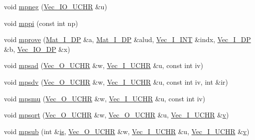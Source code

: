 \begin{DoxyCompactItemize}
\item 
void \mbox{\hyperlink{namespaceNR_a685e7aacef1a2fa63acc2b0075848293}{mpneg}} (\mbox{\hyperlink{namespaceNR_ad0cd08c957bbfcd9b612069da683fed4}{Vec\+\_\+\+I\+O\+\_\+\+U\+C\+HR}} \&u)
\item 
void \mbox{\hyperlink{namespaceNR_a994c170707a8aab5444d4d126e7a7d23}{mppi}} (const int np)
\item 
void \mbox{\hyperlink{namespaceNR_a0c4cae16b0250ecbf95693adf73c8bdc}{mprove}} (\mbox{\hyperlink{namespaceNR_a2b8abfda8fffad6ba0a1b5a4c0773dbf}{Mat\+\_\+\+I\+\_\+\+DP}} \&a, \mbox{\hyperlink{namespaceNR_a2b8abfda8fffad6ba0a1b5a4c0773dbf}{Mat\+\_\+\+I\+\_\+\+DP}} \&alud, \mbox{\hyperlink{namespaceNR_ae67ce7dc86a8a64a7ce73c3c030ff610}{Vec\+\_\+\+I\+\_\+\+I\+NT}} \&indx, \mbox{\hyperlink{namespaceNR_a9f943da53862537c552e2a770cb170ae}{Vec\+\_\+\+I\+\_\+\+DP}} \&b, \mbox{\hyperlink{namespaceNR_ab293e06a6bf799d8a7ed932b6852bcb8}{Vec\+\_\+\+I\+O\+\_\+\+DP}} \&x)
\item 
void \mbox{\hyperlink{namespaceNR_a73ec9a62342ed00c7ed70bfedecf5947}{mpsad}} (\mbox{\hyperlink{namespaceNR_ac322e5f1208609bf101390ed2495b7d5}{Vec\+\_\+\+O\+\_\+\+U\+C\+HR}} \&w, \mbox{\hyperlink{namespaceNR_ace0fbcd7daadfbf5e4e7db2a317a5b46}{Vec\+\_\+\+I\+\_\+\+U\+C\+HR}} \&u, const int iv)
\item 
void \mbox{\hyperlink{namespaceNR_afb23bc7a9b2440c5a3db4da885920358}{mpsdv}} (\mbox{\hyperlink{namespaceNR_ac322e5f1208609bf101390ed2495b7d5}{Vec\+\_\+\+O\+\_\+\+U\+C\+HR}} \&w, \mbox{\hyperlink{namespaceNR_ace0fbcd7daadfbf5e4e7db2a317a5b46}{Vec\+\_\+\+I\+\_\+\+U\+C\+HR}} \&u, const int iv, int \&ir)
\item 
void \mbox{\hyperlink{namespaceNR_a7e4bcd285f6961beca936346cd63f092}{mpsmu}} (\mbox{\hyperlink{namespaceNR_ac322e5f1208609bf101390ed2495b7d5}{Vec\+\_\+\+O\+\_\+\+U\+C\+HR}} \&w, \mbox{\hyperlink{namespaceNR_ace0fbcd7daadfbf5e4e7db2a317a5b46}{Vec\+\_\+\+I\+\_\+\+U\+C\+HR}} \&u, const int iv)
\item 
void \mbox{\hyperlink{namespaceNR_a73de1f888d26e631949996bd1e437659}{mpsqrt}} (\mbox{\hyperlink{namespaceNR_ac322e5f1208609bf101390ed2495b7d5}{Vec\+\_\+\+O\+\_\+\+U\+C\+HR}} \&w, \mbox{\hyperlink{namespaceNR_ac322e5f1208609bf101390ed2495b7d5}{Vec\+\_\+\+O\+\_\+\+U\+C\+HR}} \&u, \mbox{\hyperlink{namespaceNR_ace0fbcd7daadfbf5e4e7db2a317a5b46}{Vec\+\_\+\+I\+\_\+\+U\+C\+HR}} \&\mbox{\hyperlink{adat__devel_2lib_2hadron_2hadron__timeslice_8cc_a716fc87f5e814be3ceee2405ed6ff22a}{v}})
\item 
void \mbox{\hyperlink{namespaceNR_a6c829dc4c09a73a1c6f91c817b01bfd4}{mpsub}} (int \&\mbox{\hyperlink{x_8cc_a81abbbdef81e25584a2eab888e643d3d}{is}}, \mbox{\hyperlink{namespaceNR_ac322e5f1208609bf101390ed2495b7d5}{Vec\+\_\+\+O\+\_\+\+U\+C\+HR}} \&w, \mbox{\hyperlink{namespaceNR_ace0fbcd7daadfbf5e4e7db2a317a5b46}{Vec\+\_\+\+I\+\_\+\+U\+C\+HR}} \&u, \mbox{\hyperlink{namespaceNR_ace0fbcd7daadfbf5e4e7db2a317a5b46}{Vec\+\_\+\+I\+\_\+\+U\+C\+HR}} \&\mbox{\hyperlink{adat__devel_2lib_2hadron_2hadron__timeslice_8cc_a716fc87f5e814be3ceee2405ed6ff22a}{v}})

\end{DoxyCompactItemize}
